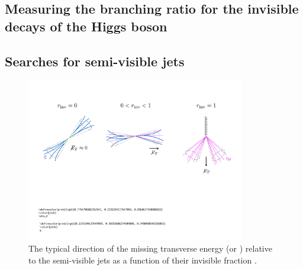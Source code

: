 \subsection{Measuring the branching ratio for the invisible decays of the Higgs boson}
\label{subsec:theory_higgs_to_inv}

\subsection{Searches for semi-visible jets}
\label{subsec:theory_svj}

\begin{figure}[htbp]
\centering
\includegraphics[width=0.85\textwidth]{figures/svj/metfigure.pdf}
\caption[The typical direction of the missing transverse energy relative to the semi-visible jets as a function of the invisible fraction \rinv]{The typical direction of the missing transverse energy \ETslash\xspace (or \ptmiss) relative to the semi-visible jets as a function of their invisible fraction \rinv \cite{Cohen:2017pzm}.}
\label{fig:theory_svj_met_dir}
\end{figure}

